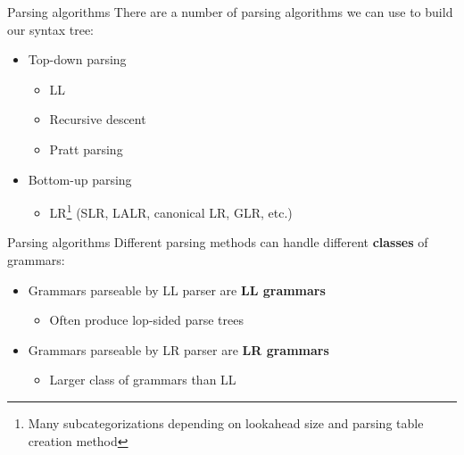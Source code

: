 \documentclass[../index.tex]{subfiles}
\begin{document}
\renewcommand{\currenttitle}{Parsing algorithms}
\begin{frame}[fragile]{\currenttitle}
  There are a number of parsing algorithms we can use to build our syntax tree:

  \begin{itemize}
    \item<2-> Top-down parsing
      \begin{itemize}
        \item LL
        \item Recursive descent
        \item Pratt parsing
      \end{itemize}
    \item<3-> Bottom-up parsing
      \begin{itemize}
        \item LR\footnote{Many subcategorizations depending on lookahead size
          and parsing table creation method}
          (SLR, LALR, canonical LR, GLR, etc.)
      \end{itemize}
  \end{itemize}

\end{frame}

\begin{frame}[fragile]{\currenttitle}
  Different parsing methods can handle different \textbf{classes} of grammars:
  \onslide<+->{}

  \begin{itemize}
    \item<+-> Grammars parseable by LL parser are \textbf{LL grammars}
      \begin{itemize}
        \item Often produce lop-sided parse trees
      \end{itemize}
    \item<+-> Grammars parseable by LR parser are \textbf{LR grammars}
      \begin{itemize}
        \item Larger class of grammars than LL
      \end{itemize}
  \end{itemize}
\end{frame}
\end{document}
